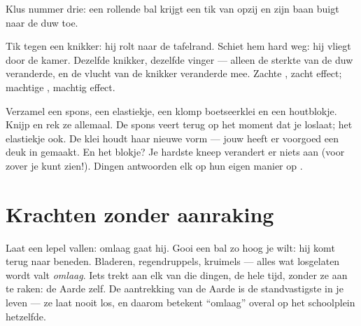 \begin{omfigure}

{\small Klus nummer drie: een rollende bal krijgt een tik van opzij en
zijn baan buigt naar de duw toe.}
\end{omfigure}

\begin{example}\label{ex:g2:pushes-and-pulls:stronger}
Tik tegen een knikker: hij rolt naar de tafelrand. Schiet hem hard
weg: hij vliegt door de kamer. Dezelfde knikker, dezelfde vinger ---
alleen de sterkte van de duw veranderde, en de vlucht van de knikker
veranderde mee. Zachte , zacht effect; machtige , machtig
effect.
\end{example}

\begin{example}\label{ex:g2:pushes-and-pulls:shape}
Verzamel een spons, een elastiekje, een klomp boetseerklei en een
houtblokje. Knijp en rek ze allemaal. De spons veert terug op het
moment dat je loslaat; het elastiekje ook. De klei houdt haar nieuwe
vorm --- jouw  heeft er voorgoed een deuk in gemaakt. En het
blokje? Je hardste kneep verandert er niets aan (voor zover je kunt
zien!). Dingen antwoorden elk op hun eigen manier op .
\end{example}

\section{Krachten zonder aanraking}

\begin{example}\label{ex:g2:pushes-and-pulls:earthpull}
Laat een lepel vallen: omlaag gaat hij. Gooi een bal zo hoog je wilt:
hij komt terug naar beneden. Bladeren, regendruppels, kruimels ---
alles wat losgelaten wordt valt \emph{omlaag}. Iets trekt aan elk van
die dingen, de hele tijd, zonder ze aan te raken: de Aarde zelf. De
aantrekking van de Aarde is de standvastigste  in je leven ---
ze laat nooit los, en daarom betekent ``omlaag'' overal op het
schoolplein hetzelfde.
\end{example}

